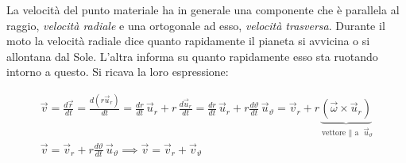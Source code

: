 La velocità del punto materiale ha in generale una componente che è parallela al raggio, \emph{velocità radiale} e una ortogonale ad esso, \emph{velocità trasversa}. Durante il moto la velocità radiale dice quanto rapidamente il pianeta si avvicina o si allontana dal Sole. L'altra informa su quanto rapidamente esso sta ruotando intorno a questo.
Si ricava la loro espressione:

\begin{gather*}
	\vec{v}=\frac{d\vec{r}}{dt}=\frac{d(r\vec{u}_r)}{dt}=\frac{dr}{dt}\,\vec{u}_r+r\,\frac{d\vec{u}_r}{dt}=\frac{dr}{dt}\,\vec{u}_r+r\frac{d\vartheta}{dt}\,\vec{u}_\vartheta=\vec{v}_r+r\underbrace{(\vec{\omega}\times\vec{u}_r)}_{\text{vettore $\parallel$ a } \vec{u}_\vartheta} \\
	\vec{v}=\vec{v}_r+r\frac{d\vartheta}{dt}\, \vec{u}_\vartheta \implies \vec{v}=\vec{v}_r+\vec{v}_\vartheta
\end{gather*}

